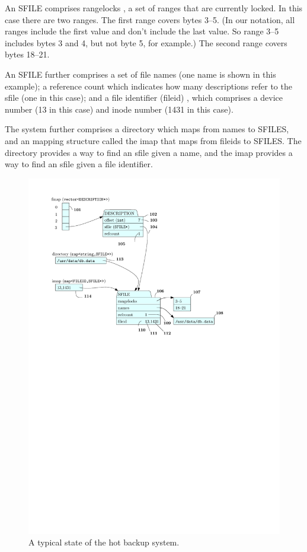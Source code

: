 \documentclass[10pt]{article}
\begin{document}
An SFILE \citesfile comprises rangelocks \citeranges, a set of ranges
that are currently locked.  In this case there are two ranges.  The
first range covers bytes 3--5.  (In our notation, all ranges include
the first value and don't include the last value.  So range 3--5
includes bytes 3 and 4, but not byte 5, for example.)  The second
range covers bytes 18--21.

An SFILE further comprises a set \citefilenames of file names (one
name is shown in this example); a reference count \citesrefcount which
indicates how many descriptions refer to the sfile (one in this case);
and a file identifier (fileid) \citefileid, which comprises a device
number \citedevnum (13 in this case) and inode number \citeinodenum
(1431 in this case).

The system further comprises a directory \citedirectory which maps
from names to SFILES, and an mapping structure called the imap \citeimap that
maps from fileids to SFILES.  The directory provides a way to find an
sfile given a name, and the imap provides a way to find an sfile given
a file identifier.

\begin{figure}
\begin{center}
\includegraphics{figures/overview.pdf}
\end{center}
\caption{A typical state of the hot backup system.}
\label{fig:overview}
\end{figure}
\end{document}

